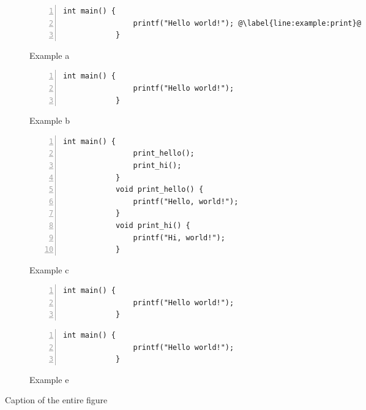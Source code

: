 \begin{figure*}[h]
	\begin{subfigure}{0.48\textwidth}
		\begin{lstlisting}[numbers=left,xleftmargin=2em]
			int main() {
				printf("Hello world!"); @\label{line:example:print}@
			}
		\end{lstlisting}
		\caption{Example a}
		\label{code:sample:a}
	\end{subfigure}
	\begin{subfigure}{0.48\textwidth}
		\begin{lstlisting}[numbers=left,xleftmargin=2em]
			int main() {
				printf("Hello world!");
			}
		\end{lstlisting}
		\caption{Example b}
		\label{code:sample:b}
	\end{subfigure}
	\begin{subfigure}{0.48\textwidth}
		\begin{lstlisting}[numbers=left,xleftmargin=2em]
			int main() {
				print_hello();
				print_hi();
			}
			void print_hello() {
				printf("Hello, world!");
			}
			void print_hi() {
				printf("Hi, world!");
			}
		\end{lstlisting}
		\caption{Example c}
		\label{code:sample:c}
	\end{subfigure}
	\hfill
	\begin{subfigure}{0.48\textwidth}
		\begin{lstlisting}[numbers=left,xleftmargin=2em]
			int main() {
				printf("Hello world!");
			}
		\end{lstlisting}
		\caption{Example d}
		\label{code:sample:d}
		\begin{lstlisting}[numbers=left,xleftmargin=2em]
			int main() {
				printf("Hello world!");
			}
		\end{lstlisting}
		\caption{Example e}
		\label{code:sample:e}
	\end{subfigure}
	\caption{Caption of the entire figure}
	\label{fig:example}
\end{figure*}
